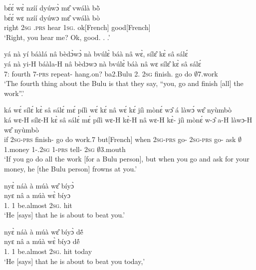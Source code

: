 \begin{exe}[(C234)]
\exC\label{107}
  \glll  bɛ́ɛ́ wɛ̀ nzíí dyúwɔ̀ mɛ̂ vwálà bõ̀ \\
        bɛ́ɛ́ wɛ nzíí dyúwɔ mɛ̂ vwálà bò\\
        right 2\textsc{sg} {\PROG}.\textsc{prs} hear 1\textsc{sg}.{\OBJ} ok[French] good[French]   \\
    \trans `Right, you hear me? Ok, good. . .'
 
\exC\label{108}
  \glll  yá nà yí báàlá nâ bèdɔ̀wɔ̀ nà bvúlɛ̀ báà nâ wɛ̀, sílɛ̂ kɛ̀ sâ sálɛ́ \\
        yá nà yi-H báàla-H nâ bèdɔwɔ nà bvúlɛ̀ báà nâ wɛ sílɛ̂ kɛ̀ sâ sálɛ́ \\
         7:{\ATT}  fourth 7-\textsc{prs} repeat-{\R} {\COMP} hang.on? {\COM} ba2.Bulu 2.{\COP} {\COMP} 2\textsc{sg} finish.{\IMP} go do $\emptyset$7.work  \\
    \trans `The fourth thing about the Bulu is that they say, ``you, go and finish [all] the work''.'


\exC\label{109}
  \glll ká wɛ́ sílɛ́ kɛ̀ sâ sálɛ́ mɛ́ pílì wɛ́ kɛ́ nâ  wɛ́ kɛ́ jíì mònɛ́ wɔ̂ á làwɔ́ wɛ̂ nyùmbò \\
        ká wɛ-H sílɛ-H kɛ̀ sâ sálɛ́ mɛ́ pílì wɛ-H kɛ̀-H nâ wɛ-H kɛ̀-{\R} jíì mònɛ́ w-ɔ̂ a-H làwɔ-H wɛ̂ nyùmbò\\
         if 2\textsc{sg}-\textsc{prs} finish-{\R} go do work.7 but[French] when 2\textsc{sg}-\textsc{prs} go-{\R} {\COMP} 2\textsc{sg}-\textsc{prs} go-{\R} ask $\emptyset$1.money 1-{\POSS}.2\textsc{sg} 1-\textsc{prs} tell-{\R} 2\textsc{sg} $\emptyset$3.mouth   \\
    \trans `If you go do all the work [for a Bulu person], but when you go and ask for your money, he [the Bulu person] frowns at you.'
 
\exC\label{110}
  \glll  nyɛ̀ náà à múà wɛ̂ bíyɔ̀ \\
        nyɛ nâ a múà wɛ̀ bíyɔ \\
           1.{\SBJ}  {\COMP} 1 be.almost 2\textsc{sg}.{\OBJ} hit \\
    \trans `He [says] that he is about to beat you.'
 
\exC\label{111}
  \glll  nyɛ̀ náà à múà wɛ̂ bíyɔ̀ dẽ́ \\
        nyɛ nâ a múà wɛ̀ bíyɔ dẽ́\\
           1.{\SBJ}  {\COMP} 1 be.almost 2\textsc{sg}.{\OBJ} hit today \\
    \trans `He [says] that he is about to beat you today,'
 

\end{exe}
